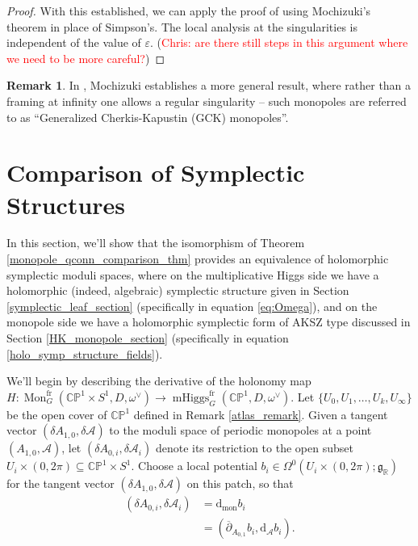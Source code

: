 \documentclass[11pt, oneside, reqno]{amsart}
\theoremstyle{definition} \newtheorem{definition}{Definition}[section]
\theoremstyle{definition} \newtheorem{remark}[definition]{Remark}
\theoremstyle{definition} \newtheorem{remarks}[definition]{Remarks}
\theoremstyle{definition} \newtheorem{question}[definition]{Question}
\theoremstyle{definition} \newtheorem*{note}{Note}
\theoremstyle{definition} \newtheorem{example}[definition]{Example}
\theoremstyle{definition} \newtheorem{examples}[definition]{Examples}
\renewcommand{\gg}{\mathfrak{g}}
\newcommand{\bb}[1]{\mathbb{#1}}
\newcommand{\mr}[1]{\mathrm{#1}}
\newcommand{\mc}[1]{\mathcal{#1}}
\newcommand{\dd}{\partial}
\newcommand{\ol}[1]{\overline{#1}}
\newcommand{\RR}{\mathbb{R}}
\newcommand{\eps}{\varepsilon}
\newcommand{\sub}{\subseteq}
\DeclareMathOperator{\mhiggs}{mHiggs}
\DeclareMathOperator{\mon}{Mon}
\renewcommand{\d}{\mathrm{d}}
\newcommand{\fr}{\mathrm{fr}}
\newcommand{\chris}[1]{(\textcolor{red}{Chris: #1})}
\begin{document}
\begin{proof}
With this established, we can apply the proof of \cite[Proposition 5.2]{Smith} using Mochizuki's theorem in place of Simpson's.  The local analysis at the singularities is independent of the value of $\eps$.
\chris{are there still steps in this argument where we need to be more careful?}
\end{proof}

\begin{remark}
In \cite{Mochizuki}, Mochizuki establishes a more general result, where rather than a framing at infinity one allows a regular singularity -- such monopoles are referred to as ``Generalized Cherkis-Kapustin (GCK) monopoles''.
\end{remark}

\section{Comparison of Symplectic Structures} \label{symp_comparison_section}

In this section, we'll show that the isomorphism of Theorem \ref{monopole_qconn_comparison_thm} provides an equivalence of holomorphic symplectic moduli spaces, where on the multiplicative Higgs side we have a holomorphic (indeed, algebraic) symplectic structure given in Section \ref{symplectic_leaf_section} (specifically in equation \ref{eq:Omega}), and on the monopole side we have a holomorphic symplectic form of AKSZ type discussed in Section \ref{HK_monopole_section} (specifically in equation \ref{holo_symp_structure_fields}).

We'll begin by describing the derivative of the holonomy map $H \colon \mon_G^\fr(\bb{CP}^1 \times S^1, D, \omega^\vee) \to \mhiggs^\fr_G(\bb{CP}^1, D, \omega^\vee)$. Let $\{U_0, U_1, \ldots, U_k, U_\infty\}$ be the open cover of $\bb{CP}^1$ defined in Remark \ref{atlas_remark}.  Given a tangent vector $(\delta A_{1,0}, \delta \mc A)$ to the moduli space of periodic monopoles at a point $(A_{1,0},\mc A)$, let $(\delta A_{0,i}, \delta \mc A_i)$ denote its restriction to the open subset $U_i \times (0, 2\pi) \sub \bb{CP}^1 \times S^1$.  Choose a local potential $b_i \in \Omega^0(U_i \times (0,2\pi); \gg_\RR)$ for the tangent vector $(\delta A_{1,0}, \delta \mc A)$ on this patch, so that
\begin{align*} 
(\delta A_{0,i}, \delta \mc A_i) &= \d_{\mr{mon}} b_i \\
&= (\ol \dd_{A_{0,1}} b_i, \mr d_{\mc A} b_i).
\end{align*}
\end{document}
